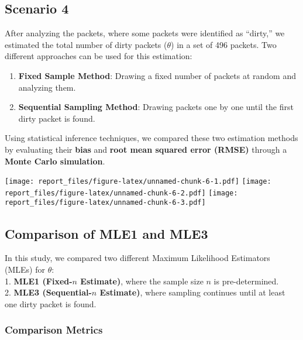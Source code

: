 \documentclass[
  14pt,
]{article}
\providecommand{\tightlist}{%
  \setlength{\itemsep}{0pt}\setlength{\parskip}{0pt}}
\begin{document}
\hfill\break

\subsection{Scenario 4}\label{scenario-4}

After analyzing the packets, where some packets were identified as
``dirty,'' we estimated the total number of dirty packets (\(\theta\))
in a set of 496 packets. Two different approaches can be used for this
estimation:

\begin{enumerate}
\def\labelenumi{\arabic{enumi}.}
\tightlist
\item
  \textbf{Fixed Sample Method}: Drawing a fixed number of packets at
  random and analyzing them.
\item
  \textbf{Sequential Sampling Method}: Drawing packets one by one until
  the first dirty packet is found.
\end{enumerate}

Using statistical inference techniques, we compared these two estimation
methods by evaluating their \textbf{bias} and \textbf{root mean squared
error (RMSE)} through a \textbf{Monte Carlo simulation}.

\hfill\break

\texttt{[image: report\_files/figure-latex/unnamed-chunk-6-1.pdf]}
\texttt{[image: report\_files/figure-latex/unnamed-chunk-6-2.pdf]}
\texttt{[image: report\_files/figure-latex/unnamed-chunk-6-3.pdf]}

\subsection{\texorpdfstring{\textbf{Comparison of MLE1 and
MLE3}}{Comparison of MLE1 and MLE3}}\label{comparison-of-mle1-and-mle3}

In this study, we compared two different Maximum Likelihood Estimators
(MLEs) for \(\theta\):\\
1. \textbf{MLE1 (Fixed-\(n\) Estimate)}, where the sample size \(n\) is
pre-determined.\\
2. \textbf{MLE3 (Sequential-\(n\) Estimate)}, where sampling continues
until at least one dirty packet is found.

\subsubsection{\texorpdfstring{\textbf{Comparison
Metrics}}{Comparison Metrics}}\label{comparison-metrics}
\end{document}
